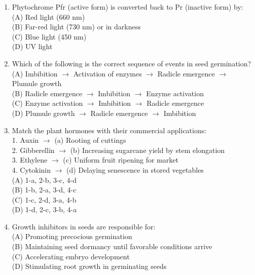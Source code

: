 \documentclass{article}
\begin{document}
\begin{enumerate}[label=Q\arabic*.]
\item Phytochrome Pfr (active form) is converted back to Pr (inactive form) by:
\\(A) Red light (660 nm)
\\(B) Far-red light (730 nm) or in darkness
\\(C) Blue light (450 nm)
\\(D) UV light

\item Which of the following is the correct sequence of events in seed germination?
\\(A) Imbibition $\rightarrow$ Activation of enzymes $\rightarrow$ Radicle emergence $\rightarrow$ Plumule growth
\\(B) Radicle emergence $\rightarrow$ Imbibition $\rightarrow$ Enzyme activation
\\(C) Enzyme activation $\rightarrow$ Imbibition $\rightarrow$ Radicle emergence
\\(D) Plumule growth $\rightarrow$ Radicle emergence $\rightarrow$ Imbibition

\item Match the plant hormones with their commercial applications:\\
1. Auxin $\rightarrow$ (a) Rooting of cuttings\\
2. Gibberellin $\rightarrow$ (b) Increasing sugarcane yield by stem elongation\\
3. Ethylene $\rightarrow$ (c) Uniform fruit ripening for market\\
4. Cytokinin $\rightarrow$ (d) Delaying senescence in stored vegetables
\\(A) 1-a, 2-b, 3-c, 4-d
\\(B) 1-b, 2-a, 3-d, 4-c
\\(C) 1-c, 2-d, 3-a, 4-b
\\(D) 1-d, 2-c, 3-b, 4-a

\item Growth inhibitors in seeds are responsible for:
\\(A) Promoting precocious germination
\\(B) Maintaining seed dormancy until favorable conditions arrive
\\(C) Accelerating embryo development
\\(D) Stimulating root growth in germinating seeds

\end{enumerate}
\end{document}
